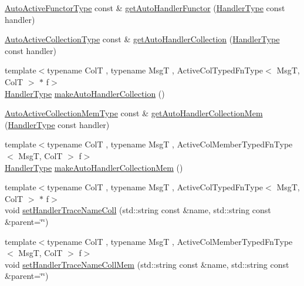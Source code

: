 \begin{DoxyCompactItemize}
\hyperlink{namespacevt_1_1auto__registry_a092979b3ed6cf9e21e6a5823fdaa0c12}{Auto\+Active\+Functor\+Type} const  \& \hyperlink{namespacevt_1_1auto__registry_ae91f2c29e8baf7efbb9887bbf0067403}{get\+Auto\+Handler\+Functor} (\hyperlink{namespacevt_af64846b57dfcaf104da3ef6967917573}{Handler\+Type} const handler)
\item 
\hyperlink{namespacevt_1_1auto__registry_a14267fe1eee84b3f2205aecac48cafe4}{Auto\+Active\+Collection\+Type} const  \& \hyperlink{namespacevt_1_1auto__registry_aa8b9f3bba171bdeddc87cd8b2293d424}{get\+Auto\+Handler\+Collection} (\hyperlink{namespacevt_af64846b57dfcaf104da3ef6967917573}{Handler\+Type} const handler)
\item 
{\footnotesize template$<$typename ColT , typename MsgT , Active\+Col\+Typed\+Fn\+Type$<$ Msg\+T, Col\+T $>$ $\ast$ f$>$ }\\\hyperlink{namespacevt_af64846b57dfcaf104da3ef6967917573}{Handler\+Type} \hyperlink{namespacevt_1_1auto__registry_aaba50e36f081bdaf661f1571a6599551}{make\+Auto\+Handler\+Collection} ()
\item 
\hyperlink{namespacevt_1_1auto__registry_af5d102e15ae09e22dbc560f5b64ec758}{Auto\+Active\+Collection\+Mem\+Type} const  \& \hyperlink{namespacevt_1_1auto__registry_aed13f53b41e1f57f0affe56b7f9b8ef2}{get\+Auto\+Handler\+Collection\+Mem} (\hyperlink{namespacevt_af64846b57dfcaf104da3ef6967917573}{Handler\+Type} const handler)
\item 
{\footnotesize template$<$typename ColT , typename MsgT , Active\+Col\+Member\+Typed\+Fn\+Type$<$ Msg\+T, Col\+T $>$ f$>$ }\\\hyperlink{namespacevt_af64846b57dfcaf104da3ef6967917573}{Handler\+Type} \hyperlink{namespacevt_1_1auto__registry_a495c63ee09b75f019a6b86957806a417}{make\+Auto\+Handler\+Collection\+Mem} ()
\item 
{\footnotesize template$<$typename ColT , typename MsgT , Active\+Col\+Typed\+Fn\+Type$<$ Msg\+T, Col\+T $>$ $\ast$ f$>$ }\\void \hyperlink{namespacevt_1_1auto__registry_a2532642e28246a717542b6a62aa8e37a}{set\+Handler\+Trace\+Name\+Coll} (std\+::string const \&name, std\+::string const \&parent=\char`\"{}\char`\"{})
\item 
{\footnotesize template$<$typename ColT , typename MsgT , Active\+Col\+Member\+Typed\+Fn\+Type$<$ Msg\+T, Col\+T $>$ f$>$ }\\void \hyperlink{namespacevt_1_1auto__registry_a409d348d2435acd9ce36a38c12d13322}{set\+Handler\+Trace\+Name\+Coll\+Mem} (std\+::string const \&name, std\+::string const \&parent=\char`\"{}\char`\"{})

\end{DoxyCompactItemize}
